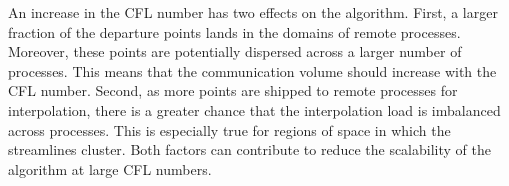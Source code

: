An increase in the CFL number has two effects on the algorithm. First, a larger fraction of the departure points lands in the domains of remote processes. Moreover, these points are potentially dispersed across a larger number of processes. This means that the communication volume should increase with the CFL number. Second, as more points are shipped to remote processes for interpolation, there is a greater chance that the interpolation load is imbalanced across processes. This is especially true for regions of space in which the streamlines cluster. Both factors can contribute to reduce the scalability of the algorithm at large CFL numbers. 
\begin{figure}[htbp]
	\begin{center}
		\\

\end{center}
\end{figure}
